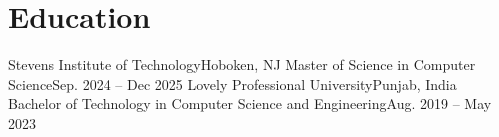 \section{Education}
    \resumeSubHeadingListStart
        \resumeSubheading
            {Stevens Institute of Technology}{Hoboken, NJ}
            {Master of Science in Computer Science}{Sep. 2024 -- Dec 2025}
        \resumeSubheading
            {Lovely Professional University}{Punjab, India}
            {Bachelor of Technology in Computer Science and Engineering}{Aug. 2019 -- May 2023}
    \resumeSubHeadingListEnd